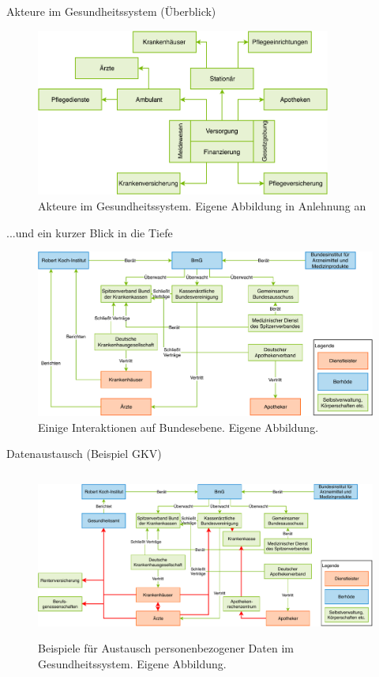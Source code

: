 \documentclass[aspectratio=169,t]{beamer}
\begin{document}
\begin{frame}{Akteure im Gesundheitssystem (Überblick)}
   \begin{figure}[h!]
    \includegraphics[height=5.5cm]{Bilder/Gesundheitssystem.pdf}
     \caption{Akteure im Gesundheitssystem. Eigene Abbildung in Anlehnung an \cite{SmartHealth}}
   \end{figure}
\end{frame}

\begin{frame}{...und ein kurzer Blick in die Tiefe}
   \begin{figure}[h!]
    \includegraphics[height=5.5cm]{Bilder/GesundheitssystemAkteureBund.pdf}
     \caption{Einige Interaktionen auf Bundesebene. Eigene Abbildung.}
   \end{figure}
\end{frame}

\begin{frame}{Datenaustausch (Beispiel GKV)}
   \begin{figure}[h!]
    \includegraphics[height=5.5cm]{Bilder/DatenfluesseGesundheitssystem.pdf}
     \caption{Beispiele für Austausch personenbezogener Daten im Gesundheitssystem. Eigene Abbildung.}
   \end{figure}
\end{frame}
\end{document}
